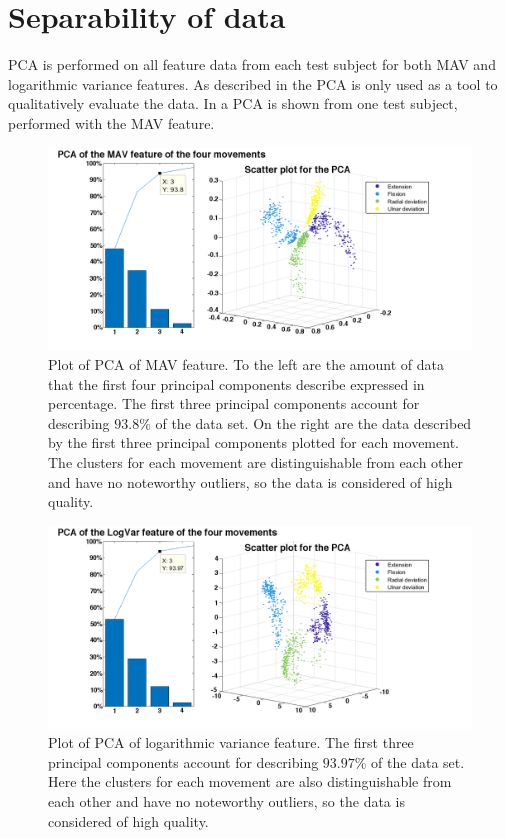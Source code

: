 \section{Separability of data}

PCA is performed on all feature data from each test subject for both MAV and logarithmic variance features. As described in  the PCA is only used as a tool to qualitatively evaluate the data. In  a PCA is shown from one test subject, performed with the MAV feature. 

\begin{figure}[H]
	\includegraphics[height=0.2\textheight,width=1.1\textwidth]{figures/results/pcasubplotMAV.png} 
	\caption{Plot of PCA of MAV feature. To the left are the amount of data that the first four principal components describe expressed in percentage. The first three principal components account for describing $93.8\%$ of the data set. On the right are the data described by the first three principal components plotted for each movement. The clusters for each movement are distinguishable from each other and have no noteworthy outliers, so the data is considered of high quality.} 
	\label{fig:pcasubplotMAV}
\end{figure} 

\begin{figure}[H]
	\includegraphics[height=0.2\textheight,width=1.1\textwidth]{figures/results/pcasubplotLogVar.png} 
	\caption{Plot of PCA of logarithmic variance feature. The first three principal components account for describing $93.97\%$ of the data set. Here the clusters for each movement are also distinguishable from each other and have no noteworthy outliers, so the data is considered of high quality.} 
	\label{fig:pcasubplotLogVar}
\end{figure}

